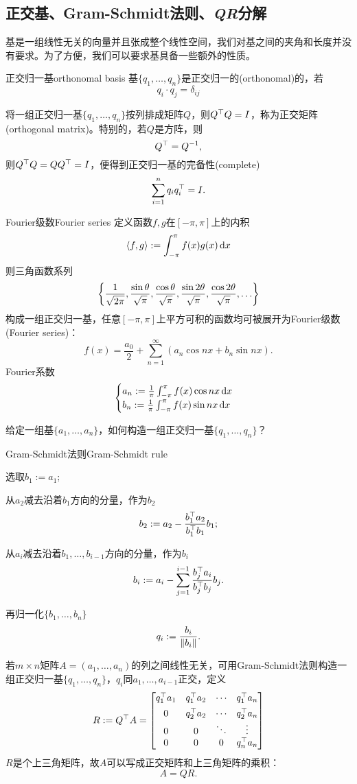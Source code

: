 \subsection{正交基、Gram-Schmidt法则、\textit{QR}分解}
基是一组线性无关的向量并且张成整个线性空间，我们对基之间的夹角和长度并没有要求。为了方便，我们可以要求基具备一些额外的性质。
\begin{definition}{正交归一基}{orthonomal basis}
	基$\{q_1,\ldots,q_n\}$是正交归一的(orthonomal)的，若 
	\[
		q_i\cdot q_j=\delta_{ij}
	\]
\end{definition}
将一组正交归一基$\{q_1,\ldots,q_n\}$按列排成矩阵$Q$，则$Q^\top Q=I$，称为正交矩阵(orthogonal matrix)。特别的，若$Q$是方阵，则
\[
	Q^\top=Q^{-1},
\]
则$Q^\top Q=QQ^\top=I$，便得到正交归一基的完备性(complete)
\[
	\sum_{i=1}^nq_iq_i^\top=I.
\]
\begin{example}{Fourier级数}{Fourier series}
	定义函数$f,g$在$[-\pi,\pi]$上的内积
	\[
		\left\langle f,g\right\rangle:=\int_{-\pi}^\pi f(x)g(x)\mathop{}\!\mathrm{d} x
	\]
	则三角函数系列
	\[
		\left\{\frac1{\sqrt{2\pi}},\frac{\sin\theta}{\sqrt\pi},\frac{\cos\theta}{\sqrt\pi},\frac{\sin2\theta}{\sqrt\pi},\frac{\cos2\theta}{\sqrt\pi},\ldots\right\}
	\]
	构成一组正交归一基，任意$[-\pi,\pi]$上平方可积的函数均可被展开为Fourier级数(Fourier series)：
	\[
		f(x)=\frac{a_0}2+\sum_{n=1}^\infty(a_n\cos nx+b_n\sin nx).
	\]
	Fourier系数
	\[
		\begin{cases}
			a_n:=\frac1\pi\int_{-\pi}^\pi f(x)\cos nx\mathop{}\!\mathrm{d} x\\
			b_n:=\frac1\pi\int_{-\pi}^\pi f(x)\sin nx\mathop{}\!\mathrm{d} x
		\end{cases}
	\]
\end{example}
给定一组基$\{a_1,\ldots,a_n\}$，如何构造一组正交归一基$\{q_1,\ldots,q_n\}$？
\begin{method}{Gram-Schmidt法则}{Gram-Schmidt rule}
	\begin{compactenum}
		\item 选取$b_1:=a_1;$
		\item 从$a_2$减去沿着$b_1$方向的分量，作为$b_2$
		\[
			b_2:=a_2-\frac{b_1^\top a_2}{b_1^\top b_1}b_1;
		\]
		\item 从$a_i$减去沿着$b_1,\ldots,b_{i-1}$方向的分量，作为$b_i$
		\[
			b_i:=a_i-\sum_{j=1}^{i-1}\frac{b_j^\top a_i}{b_j^\top b_j}b_j.
		\]
	\end{compactenum}
	再归一化$\{b_1,\ldots,b_n\}$
	\[
		q_i:=\frac{b_i}{\left\lVert b_i\right\rVert}.
	\]
\end{method}
若$m\times n$矩阵$A=(a_1,\ldots,a_n)$的列之间线性无关，可用Gram-Schmidt法则构造一组正交归一基$\{q_1,\ldots,q_n\}$，$q_i$同$a_1,\ldots,a_{i-1}$正交，定义
\[
	R:=Q^\top A=\begin{bmatrix}
		q_1^\top a_1&q_1^\top a_2&\cdots&q_1^\top a_n\\[1ex]
		0&q_2^\top a_2&\cdots&q_2^\top a_n\\
		0&0&\ddots&\vdots\\
		0&0&0&q_n^\top a_n
	\end{bmatrix}
\]
$R$是个上三角矩阵，故$A$可以写成正交矩阵和上三角矩阵的乘积：
\begin{equation}
	A=QR.
\end{equation}

